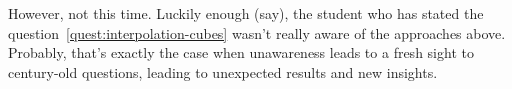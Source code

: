 However, not this time.
Luckily enough (say), the student who has stated the question~\eqref{quest:interpolation-cubes}
wasn't really aware of the approaches above.
Probably, that's exactly the case when unawareness leads to a fresh sight to century-old questions,
leading to unexpected results and new insights.

